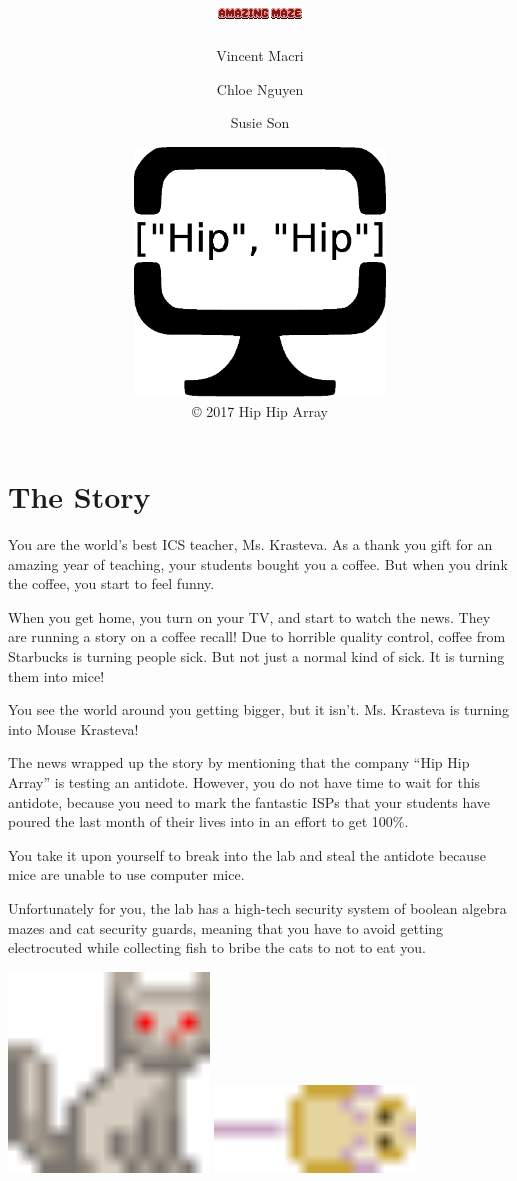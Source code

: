 \documentclass[12pt]{book}
\title{\includegraphics[width=\textwidth]{GameLogo}}
\author{Vincent Macri \and Chloe Nguyen \and Susie Son}
\date{\includegraphics[width=0.5\textwidth]{CompanyLogo}\\\copyright{} 2017 Hip Hip Array}
\begin{document}
	\maketitle
	\begingroup
		\let\cleardoublepage\clearpage
		\frontmatter
		\tableofcontents
		\mainmatter
	\endgroup
	\chapter{The Story}
		You are the world's best ICS teacher, Ms. Krasteva. As a thank you gift for an amazing year of teaching, your students bought you a coffee. But when you drink the coffee, you start to feel funny.

		When you get home, you turn on your TV, and start to watch the news. They are running a story on a coffee recall! Due to horrible quality control, coffee from Starbucks is turning people sick. But not just a normal kind of sick. It is turning them into mice!

		You see the world around you getting bigger, but it isn't. Ms. Krasteva is turning into Mouse Krasteva!

		The news wrapped up the story by mentioning that the company ``Hip Hip Array'' is testing an antidote. However, you do not have time to wait for this antidote, because you need to mark the fantastic ISPs that your students have poured the last month of their lives into in an effort to get 100\%.

		You take it upon yourself to break into the lab and steal the antidote because mice are unable to use computer mice.

		Unfortunately for you, the lab has a high-tech security system of boolean algebra mazes and cat security guards, meaning that you have to avoid getting electrocuted while collecting fish to bribe the cats to not to eat you.
		\begin{center}
			\includegraphics[width=0.4\textwidth]{Cat}
			\hspace{5mm}
			\includegraphics[width=0.4\textwidth]{Mouse}
		\end{center}
\end{document}
